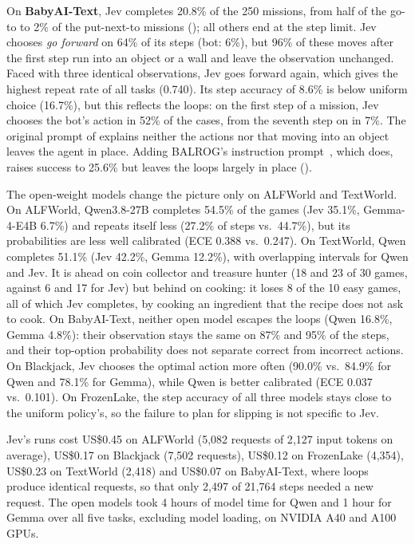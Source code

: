 \documentclass[table]{article}
\begin{document}
On \textbf{BabyAI-Text}, Jev completes 20.8\% of the 250 missions, from half of the go-to to 2\% of the put-next-to missions (); all others end at the step limit. Jev chooses \emph{go forward} on 64\% of its steps (bot: 6\%), but 96\% of these moves after the first step run into an object or a wall and leave the observation unchanged. Faced with three identical observations, Jev goes forward again, which gives the highest repeat rate of all tasks (0.740). Its step accuracy of 8.6\% is below uniform choice (16.7\%), but this reflects the loops: on the first step of a mission, Jev chooses the bot's action in 52\% of the cases, from the seventh step on in 7\%. The original prompt of \citet{carta2023grounding} explains neither the actions nor that moving into an object leaves the agent in place. Adding BALROG's instruction prompt~\cite{paglieri2025balrog}, which does, raises success to 25.6\% but leaves the loops largely in place ().


The open-weight models change the picture only on ALFWorld and TextWorld. On ALFWorld, Qwen3.8-27B completes 54.5\% of the games (Jev 35.1\%, Gemma-4-E4B 6.7\%) and repeats itself less (27.2\% of steps vs.\ 44.7\%), but its probabilities are less well calibrated (ECE 0.388 vs.\ 0.247). On TextWorld, Qwen completes 51.1\% (Jev 42.2\%, Gemma 12.2\%), with overlapping intervals for Qwen and Jev. It is ahead on coin collector and treasure hunter (18 and 23 of 30 games, against 6 and 17 for Jev) but behind on cooking: it loses 8 of the 10 easy games, all of which Jev completes, by cooking an ingredient that the recipe does not ask to cook. On BabyAI-Text, neither open model escapes the loops (Qwen 16.8\%, Gemma 4.8\%): their observation stays the same on 87\% and 95\% of the steps, and their top-option probability does not separate correct from incorrect actions. On Blackjack, Jev chooses the optimal action more often (90.0\% vs.\ 84.9\% for Qwen and 78.1\% for Gemma), while Qwen is better calibrated (ECE 0.037 vs.\ 0.101). On FrozenLake, the step accuracy of all three models stays close to the uniform policy's, so the failure to plan for slipping is not specific to Jev.


Jev's runs cost US\$0.45 on ALFWorld (5{,}082 requests of 2{,}127 input tokens on average), US\$0.17 on Blackjack (7{,}502 requests), US\$0.12 on FrozenLake (4{,}354), US\$0.23 on TextWorld (2{,}418) and US\$0.07 on BabyAI-Text, where loops produce identical requests, so that only 2{,}497 of 21{,}764 steps needed a new request. The open models took 4 hours of model time for Qwen and 1 hour for Gemma over all five tasks, excluding model loading, on NVIDIA A40 and A100 GPUs.
\end{document}
